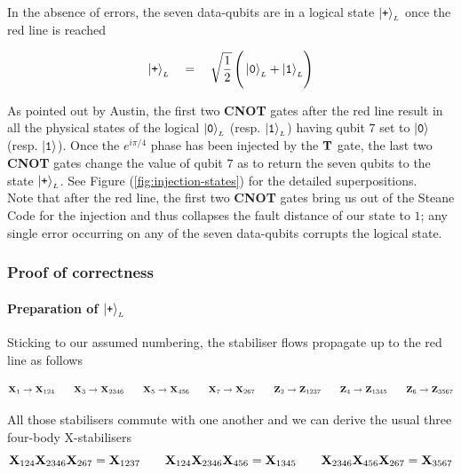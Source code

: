 \documentclass{article}
\newcommand{\sub}[1]{_{\scriptscriptstyle #1}}
\newcommand{\Op}[1]{{\bf #1}}
\newcommand{\kett}[1]{\ket{\mbox{\tt #1}}}
\begin{document}
	In the absence of errors, the seven data-qubits are in a logical state $\kett{+}\sub{L}$ once the red line is reached
	
	\begin{equation*}
		\kett{+}\sub{L} \quad=\quad
			\sqrt{\frac{1}{2}}\left(\vphantom{\sqrt{\frac{1}{2}}}
				\kett{0}\sub{L} + \kett{1}\sub{L}
			\right)
		\label{eq:logical-plus-state}
	\end{equation*}

	As pointed out by Austin, the first two \Op{CNOT} gates after the red line result in all the physical states of the logical $\kett{0}\sub{L}$ (resp. $\kett{1}\sub{L}$) having qubit $7$ set to $\kett{0}$ (resp. $\kett{1}$). Once the $e^{i\pi/4}$ phase has been injected by the $\Op{T}$ gate, the last two \Op{CNOT} gates change the value of qubit $7$ as to return the seven qubits to the state $\kett{+}\sub{L}$. See Figure (\ref{fig:injection-states}) for the detailed superpositions. \\
	
	Note that after the red line, the first two \Op{CNOT} gates bring us out of the Steane Code for the injection and thus collapses the fault distance of our state to $1$; any single error occurring on any of the seven data-qubits corrupts the logical state.

	\subsubsection{Proof of correctness}

	\paragraph{Preparation of $\kett{+}\sub{L}$ } Sticking to our assumed numbering, the stabiliser flows propagate up to the red line as follows

	\begin{equation*}
		\Op{X}_{1} \rightarrow \Op{X}_{124}
		\qquad
		\Op{X}_{3} \rightarrow \Op{X}_{2346}
		\qquad
		\Op{X}_{5} \rightarrow \Op{X}_{456}
		\qquad
		\Op{X}_{7} \rightarrow \Op{X}_{267}
		\qquad
		\Op{Z}_{2} \rightarrow \Op{Z}_{1237}
		\qquad
		\Op{Z}_{4} \rightarrow \Op{Z}_{1345}
		\qquad
		\Op{Z}_{6} \rightarrow \Op{Z}_{3567}
	\end{equation*}

	All those stabilisers commute with one another and we can derive the usual three four-body X-stabilisers
	\begin{equation*}
		\Op{X}_{124}\Op{X}_{2346}\Op{X}_{267} = \Op{X}_{1237}
		\qquad
		\Op{X}_{124}\Op{X}_{2346}\Op{X}_{456} = \Op{X}_{1345}
		\qquad
		\Op{X}_{2346}\Op{X}_{456}\Op{X}_{267} = \Op{X}_{3567}
	\end{equation*}
\end{document}
